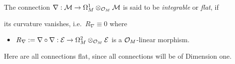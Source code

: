 \begin{defn}
  The connection $\nabla:\mathcal{M}\to \Omega_M^1\otimes_{\mathcal{O}_M}\mathcal{M}$ is said to be
  \emph{integrable} or \emph{flat}, if
  \begin{einr}
    its curvature vanishes, i.e.\ $R_\nabla\equiv0$ where
    \begin{itemize}
      \item $R_\nabla:=\nabla\circ\nabla:\mathcal{E}\to\Omega_M^2\otimes_{\mathcal{O}_M}\mathcal{E}$
        is a $\mathcal{O}_M$-linear morphism.
    \end{itemize}
  \end{einr}
  \begin{comment}
    \begin{s-prop}
      \marginnote{\cite[0.12.4]{sabbah2007isomonodromic}}
      The connection $\nabla$ is flat if and only if, in any local basis $e$ of
      $\cM$, the connection matrix $\Omega$ satisfies
      \[
        d\Omega + \Omega \wedge \Omega = 0.
      \]
      This means that the flatness condition is sufficient to assure the
      existence of local fundamental solutions.
    \end{s-prop}
  \end{comment}
  \begin{s-rem}
    Here are all connections flat, since all connections will be of Dimension
    one.
    \TODO[cf\dots]
  \end{s-rem}
  \begin{comment}
    We will say that a connection on a meromorphic bundle is \emph{integrable}
    or \emph{flat} if its restriction to $M\backslash Z$ is an integrable
    connection on the holomorphic bundle $\sM_{|M\backslash Z}$.
  \end{comment}
\end{defn}

